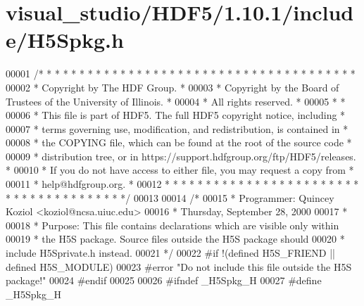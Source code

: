 \hypertarget{visual__studio_2_h_d_f5_21_810_81_2include_2_h5_spkg_8h_source}{}\section{visual\+\_\+studio/\+H\+D\+F5/1.10.1/include/\+H5\+Spkg.h}
\label{visual__studio_2_h_d_f5_21_810_81_2include_2_h5_spkg_8h_source}

\begin{DoxyCode}
00001 \textcolor{comment}{/* * * * * * * * * * * * * * * * * * * * * * * * * * * * * * * * * * * * * * *}
00002 \textcolor{comment}{ * Copyright by The HDF Group.                                               *}
00003 \textcolor{comment}{ * Copyright by the Board of Trustees of the University of Illinois.         *}
00004 \textcolor{comment}{ * All rights reserved.                                                      *}
00005 \textcolor{comment}{ *                                                                           *}
00006 \textcolor{comment}{ * This file is part of HDF5.  The full HDF5 copyright notice, including     *}
00007 \textcolor{comment}{ * terms governing use, modification, and redistribution, is contained in    *}
00008 \textcolor{comment}{ * the COPYING file, which can be found at the root of the source code       *}
00009 \textcolor{comment}{ * distribution tree, or in https://support.hdfgroup.org/ftp/HDF5/releases.  *}
00010 \textcolor{comment}{ * If you do not have access to either file, you may request a copy from     *}
00011 \textcolor{comment}{ * help@hdfgroup.org.                                                        *}
00012 \textcolor{comment}{ * * * * * * * * * * * * * * * * * * * * * * * * * * * * * * * * * * * * * * */}
00013 
00014 \textcolor{comment}{/*}
00015 \textcolor{comment}{ * Programmer:  Quincey Koziol <koziol@ncsa.uiuc.edu>}
00016 \textcolor{comment}{ *      Thursday, September 28, 2000}
00017 \textcolor{comment}{ *}
00018 \textcolor{comment}{ * Purpose: This file contains declarations which are visible only within}
00019 \textcolor{comment}{ *      the H5S package.  Source files outside the H5S package should}
00020 \textcolor{comment}{ *      include H5Sprivate.h instead.}
00021 \textcolor{comment}{ */}
00022 \textcolor{preprocessor}{#if !(defined H5S\_FRIEND || defined H5S\_MODULE)}
00023 \textcolor{preprocessor}{#error "Do not include this file outside the H5S package!"}
00024 \textcolor{preprocessor}{#endif}
00025 
00026 \textcolor{preprocessor}{#ifndef \_H5Spkg\_H}
00027 \textcolor{preprocessor}{#define \_H5Spkg\_H}

\end{DoxyCode}

